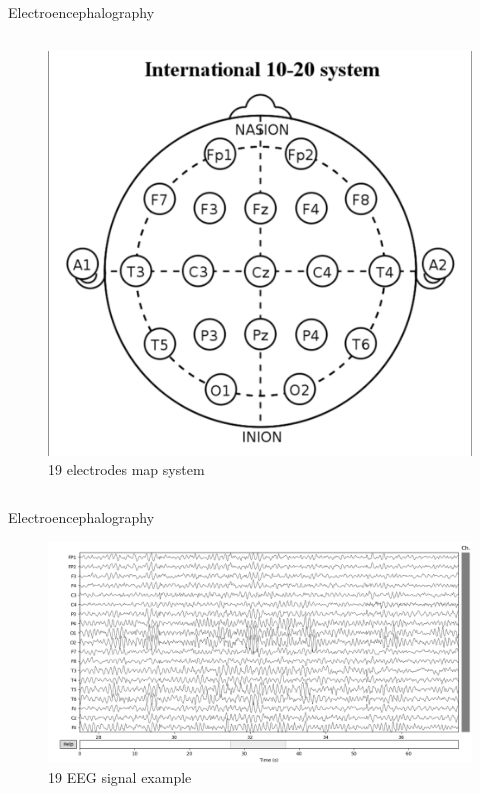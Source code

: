 \documentclass[xcolor=dvipsnames]{beamer} %
\begin{document}
\begin{frame}{Electroencephalography}
\begin{columns}
        \begin{column}{0.5\textwidth}
            \begin{figure}
                \centering
                \includegraphics[scale=0.55]{images/EEG_electrodes_map_19.png}
                \caption{19 electrodes map system}
                \label{fig:19}
            \end{figure}
        \end{column}
        \end{columns}
    \end{frame}
    
    \begin{frame}{Electroencephalography}
        \begin{figure}
            \centering
            \includegraphics[scale = 0.25]{images/EEG_with_MNE.png}
            \caption{19 EEG signal example}
            \label{fig:fulldisplay}
        \end{figure}
    \end{frame}
    
\end{document}
